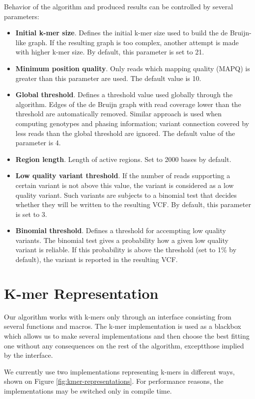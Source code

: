 Behavior of the algorithm and produced results can be controlled by several parameters:
\begin{itemize}
\item \textbf{Initial k-mer size}. Defines the initial k-mer size used to build the de Bruijn-like graph. If the resulting graph is too complex, another attempt is made with higher k-mer size. By default, this parameter is set to 21.
\item \textbf{Minimum position quality}. Only reads which mapping quality (MAPQ) is greater than this parameter are used. The default value is 10.
\item \textbf{Global threshold}. Defines a threshold value used globally through the algorithm. Edges of the de Bruijn graph with read coverage lower than the threshold are automatically removed. Similar approach is used when computing genotypes and phasing information; variant connection covered by less reads than the global threshold are ignored. The default value of the parameter is 4.
\item \textbf{Region length}. Length of active regions. Set to 2000 bases by default.
\item \textbf{Low quality variant threshold}. If the number of reads supporting a certain variant is not above this value, the variant is considered as a low quality variant. Such variants are subjects to a binomial test that decides whether they will be written to the resulting VCF. By default, this parameter is set to 3.
\item \textbf{Binomial threshold}. Defines a threshold for accempting low quality variants. The binomial test gives a probability how a given low quality variant is reliable. If this probability is above the threshold (set to 1\% by default), the variant is reported in the resulting VCF.
\end{itemize}

\section{K-mer Representation}
\label{sec:kmer-representation}

Our algorithm works with k-mers only through an interface consisting from several functions and macros. The k-mer implementation is used as a blackbox which allows us to make several implementations and then choose the best fitting one without any consequences on the rest of the algorithm, exceptthose implied by the interface.

We currently use two implementations representing k-mers in different ways, shown on Figure \ref{fig:kmer-representations}. For performance reasons, the implementations may be switched only in compile time. 

